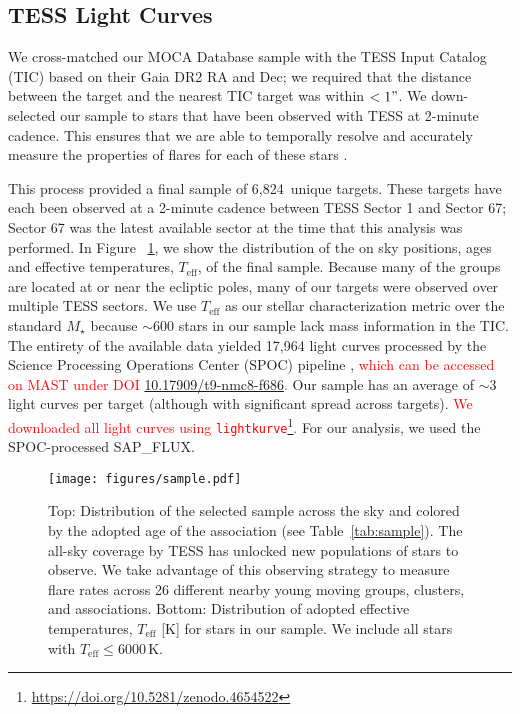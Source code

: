 \documentclass[twocolumn, linenumbers]{aastex631}
\newcommand{\nstars}{6,824}
\begin{document}
\subsection{TESS Light Curves}\label{subsec2:TESS_lightcurve}

We cross-matched our MOCA Database sample with the TESS Input Catalog (TIC) based
on their Gaia DR2 RA and Dec; we required that the distance between the target and
the nearest TIC target was within $<1"$. We down-selected our sample to stars that
have been observed with TESS at 2-minute cadence. This ensures that we are able to
temporally resolve and accurately measure the properties of flares for each of these
stars \citep{howard22}.

This process provided a final sample of \nstars\ unique targets. These targets
have each been observed at a 2-minute cadence between TESS Sector 1 and Sector 67;
Sector 67 was the latest available sector at the time that this analysis was performed.
In Figure ~\ref{fig:sample}, we show the distribution of the on sky positions, ages
and effective temperatures, $T_\textrm{eff}$, of the final sample. Because many of
the groups are located at or near the ecliptic poles, many of our targets were observed
over multiple TESS sectors. We use $T_\textrm{eff}$ as our stellar characterization
metric over the standard $M_\star$ because $\sim 600$ stars in our sample lack mass
information in the TIC. The entirety of the available data yielded 17,964 light curves
processed by the Science Processing Operations Center (SPOC) pipeline \citep{jenkins16},
\textcolor{red}{which can be accessed on MAST under DOI  \href{http://dx.doi.org/10.17909/t9-nmc8-f686}{10.17909/t9-nmc8-f686}.}
Our sample has an average of $\sim 3$ light curves per target (although with significant
spread across targets). \textcolor{red}{We downloaded all light curves using \texttt{lightkurve}\footnote{\url{https://doi.org/10.5281/zenodo.4654522}}.}
For our analysis, we used the SPOC-processed SAP\_FLUX.

\begin{figure}[ht!]
    \begin{centering}
        \texttt{[image: figures/sample.pdf]}
        \caption{
            Top: Distribution of the selected sample across the sky and colored by the adopted age of the association (see Table~\ref{tab:sample}). The all-sky coverage by TESS
            has unlocked new populations of stars to observe. We take advantage of this observing strategy to measure flare rates across 26 different nearby young moving groups,
            clusters, and associations. Bottom: Distribution of adopted effective temperatures, $T_\textrm{eff}$ [K] for stars in our sample. We include all stars with $T_\textrm{eff} \leq 6000$\,K.
        }
        \label{fig:sample}
    \end{centering}
\end{figure}
\end{document}
